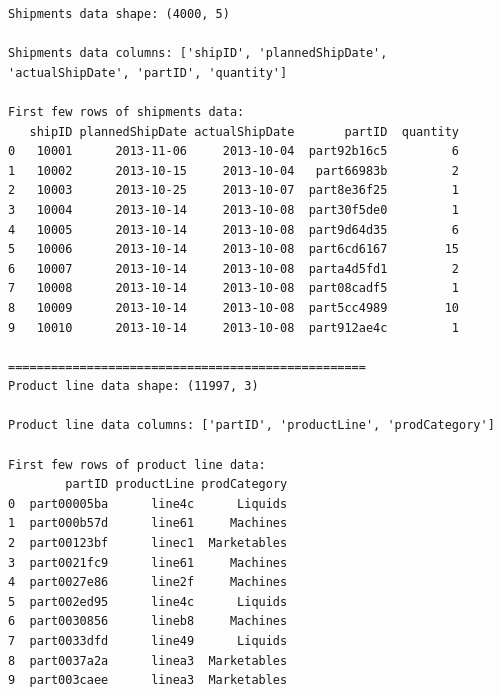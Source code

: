 \documentclass[
  letterpaper,
  DIV=11,
  numbers=noendperiod]{scrartcl}
\begin{document}
\begin{verbatim}
Shipments data shape: (4000, 5)

Shipments data columns: ['shipID', 'plannedShipDate', 'actualShipDate', 'partID', 'quantity']

First few rows of shipments data:
   shipID plannedShipDate actualShipDate       partID  quantity
0   10001      2013-11-06     2013-10-04  part92b16c5         6
1   10002      2013-10-15     2013-10-04   part66983b         2
2   10003      2013-10-25     2013-10-07  part8e36f25         1
3   10004      2013-10-14     2013-10-08  part30f5de0         1
4   10005      2013-10-14     2013-10-08  part9d64d35         6
5   10006      2013-10-14     2013-10-08  part6cd6167        15
6   10007      2013-10-14     2013-10-08  parta4d5fd1         2
7   10008      2013-10-14     2013-10-08  part08cadf5         1
8   10009      2013-10-14     2013-10-08  part5cc4989        10
9   10010      2013-10-14     2013-10-08  part912ae4c         1

==================================================
Product line data shape: (11997, 3)

Product line data columns: ['partID', 'productLine', 'prodCategory']

First few rows of product line data:
        partID productLine prodCategory
0  part00005ba      line4c      Liquids
1  part000b57d      line61     Machines
2  part00123bf      linec1  Marketables
3  part0021fc9      line61     Machines
4  part0027e86      line2f     Machines
5  part002ed95      line4c      Liquids
6  part0030856      lineb8     Machines
7  part0033dfd      line49      Liquids
8  part0037a2a      linea3  Marketables
9  part003caee      linea3  Marketables
\end{verbatim}
\end{document}
